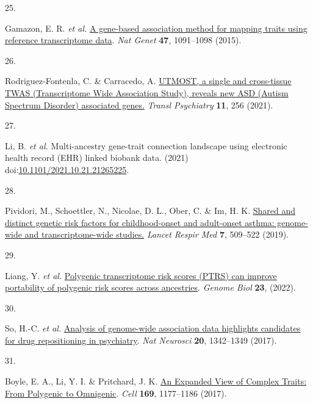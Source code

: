 \documentclass[
  a4paper,
]{article}
\newlength{\cslhangindent}
\newlength{\csllabelwidth}
\newlength{\cslentryspacingunit} %
\newenvironment{CSLReferences}[2] %
 {%
  \setlength{\parindent}{0pt}
  \ifodd #1
  \let\oldpar\par
  \def\par{\hangindent=\cslhangindent\oldpar}
  \fi
  \setlength{\parskip}{#2\cslentryspacingunit}
 }%
 {}
\newcommand{\CSLLeftMargin}[1]{\parbox[t]{\csllabelwidth}{#1}}
\newcommand{\CSLRightInline}[1]{\parbox[t]{\linewidth - \csllabelwidth}{#1}\break}
\begin{document}
\begin{CSLReferences}{0}{0}
\leavevmode{}%
\CSLLeftMargin{25. }%
\CSLRightInline{Gamazon, E. R. \emph{et al.} \href{https://doi.org/10.1038/ng.3367}{A gene-based association method for mapping traits using reference transcriptome data}. \emph{Nat Genet} \textbf{47}, 1091--1098 (2015).}

\leavevmode{}%
\CSLLeftMargin{26. }%
\CSLRightInline{Rodriguez-Fontenla, C. \& Carracedo, A. \href{https://doi.org/10.1038/s41398-021-01378-8}{UTMOST, a single and cross-tissue TWAS (Transcriptome Wide Association Study), reveals new ASD (Autism Spectrum Disorder) associated genes.} \emph{Transl Psychiatry} \textbf{11}, 256 (2021).}

\leavevmode{}%
\CSLLeftMargin{27. }%
\CSLRightInline{Li, B. \emph{et al.} Multi-ancestry gene-trait connection landscape using electronic health record (EHR) linked biobank data. (2021) doi:\href{https://doi.org/10.1101/2021.10.21.21265225}{10.1101/2021.10.21.21265225}.}

\leavevmode{}%
\CSLLeftMargin{28. }%
\CSLRightInline{Pividori, M., Schoettler, N., Nicolae, D. L., Ober, C. \& Im, H. K. \href{https://doi.org/10.1016/s2213-2600(19)30055-4}{Shared and distinct genetic risk factors for childhood-onset and adult-onset asthma: genome-wide and transcriptome-wide studies.} \emph{Lancet Respir Med} \textbf{7}, 509--522 (2019).}

\leavevmode{}%
\CSLLeftMargin{29. }%
\CSLRightInline{Liang, Y. \emph{et al.} \href{https://doi.org/10.1186/s13059-021-02591-w}{Polygenic transcriptome risk scores (PTRS) can improve portability of polygenic risk scores across ancestries}. \emph{Genome Biol} \textbf{23}, (2022).}

\leavevmode{}%
\CSLLeftMargin{30. }%
\CSLRightInline{So, H.-C. \emph{et al.} \href{https://doi.org/10.1038/nn.4618}{Analysis of genome-wide association data highlights candidates for drug repositioning in psychiatry}. \emph{Nat Neurosci} \textbf{20}, 1342--1349 (2017).}

\leavevmode{}%
\CSLLeftMargin{31. }%
\CSLRightInline{Boyle, E. A., Li, Y. I. \& Pritchard, J. K. \href{https://doi.org/10.1016/j.cell.2017.05.038}{An Expanded View of Complex Traits: From Polygenic to Omnigenic}. \emph{Cell} \textbf{169}, 1177--1186 (2017).}


\end{CSLReferences}
\end{document}
